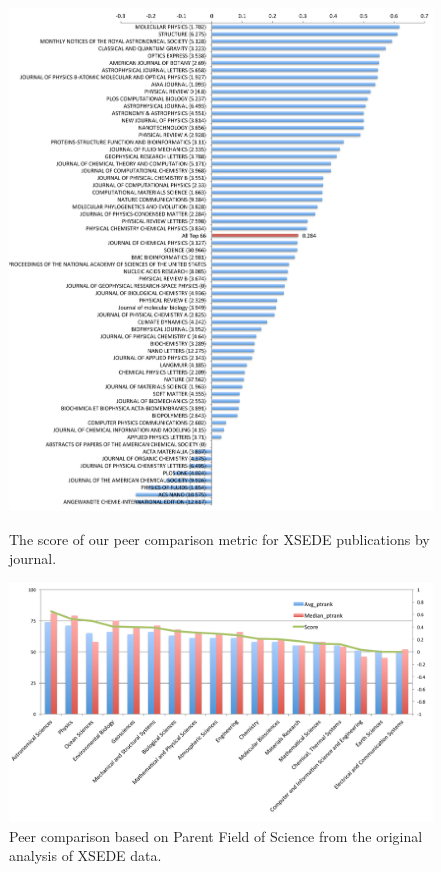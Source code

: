 \documentclass[10pt, conference, compsocconf]{IEEEtran}
\begin{document}
\begin{figure}[H]
\includegraphics[width=.9\columnwidth]{images-new/xsede-journal-score.pdf} 
\vspace{-6pt}
\caption{The score of our peer comparison metric for XSEDE publications by journal.}\label{F:xsede-score}

  \centering 
    \includegraphics[width=1.0\columnwidth]{images-new/b.pdf} 
\vspace{-18pt}
  \caption{Peer comparison based on Parent Field of Science from the original analysis of XSEDE data.}\label{F:xsede-stacked-b} 


\end{figure}
\end{document}
